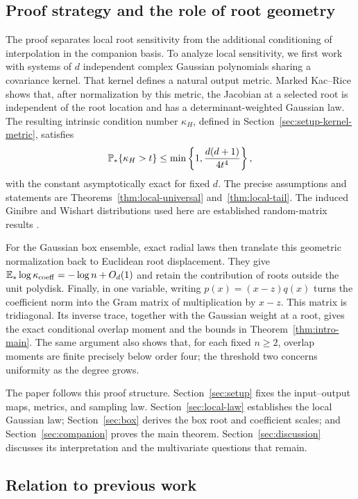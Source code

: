 \subsection{Proof strategy and the role of root geometry}

The proof separates local root sensitivity from the additional conditioning
of interpolation in the companion basis. To analyze local sensitivity, we
first work with systems of $d$ independent complex Gaussian polynomials
sharing a covariance kernel. That kernel defines a natural output metric.
Marked Kac--Rice shows that, after normalization by this metric, the Jacobian
at a selected root is independent of the root location and has a
determinant-weighted Gaussian law. The resulting intrinsic condition number
$\kappa_H$, defined in Section~\ref{sec:setup-kernel-metric}, satisfies
\[
 \mathbb P_*\{\kappa_H>t\}\le
 \min\left\{1,\frac{d(d+1)}{4t^4}\right\},
\]
with the constant asymptotically exact for fixed $d$. The precise assumptions
and statements are Theorems~\ref{thm:local-universal} and~\ref{thm:local-tail}.
The induced Ginibre and Wishart distributions used here are established
random-matrix results \cite{fischmann2012induced,kumar2017smallest}.

For the Gaussian box ensemble, exact radial laws then translate this geometric
normalization back to Euclidean root displacement. They give
$\mathbb E_*\log\kappa_{\mathrm{coeff}}=-\log n+O_d(1)$ and retain the
contribution of roots outside the unit polydisk. Finally, in one variable,
writing $p(x)=(x-z)q(x)$ turns the coefficient norm into the Gram matrix of
multiplication by $x-z$. This matrix is tridiagonal. Its inverse trace, together
with the Gaussian weight at a root, gives the exact conditional overlap moment
and the bounds in Theorem~\ref{thm:intro-main}. The same argument also shows
that, for each fixed $n\ge2$, overlap moments are finite precisely below order
four; the threshold two concerns uniformity as the degree grows.

The paper follows this proof structure. Section~\ref{sec:setup} fixes the
input--output maps, metrics, and sampling law.
Section~\ref{sec:local-law} establishes the local Gaussian law;
Section~\ref{sec:box} derives the box root and coefficient scales; and
Section~\ref{sec:companion} proves the main theorem.
Section~\ref{sec:discussion} discusses its interpretation and the multivariate
questions that remain.

\subsection{Relation to previous work}\label{sec:intro-previous}

